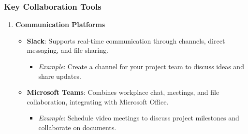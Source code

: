 \documentclass[aspectratio=169]{beamer}
\begin{document}
\begin{frame}[fragile]
    \frametitle{Key Collaboration Tools}
    \begin{enumerate}
        \item \textbf{Communication Platforms}
        \begin{itemize}
            \item \textbf{Slack}: Supports real-time communication through channels, direct messaging, and file sharing.
              \begin{itemize}
                  \item \textit{Example}: Create a channel for your project team to discuss ideas and share updates.
              \end{itemize}
            \item \textbf{Microsoft Teams}: Combines workplace chat, meetings, and file collaboration, integrating with Microsoft Office.
              \begin{itemize}
                  \item \textit{Example}: Schedule video meetings to discuss project milestones and collaborate on documents.
              \end{itemize}
        \end{itemize}
    \end{enumerate}
\end{frame}
\end{document}
